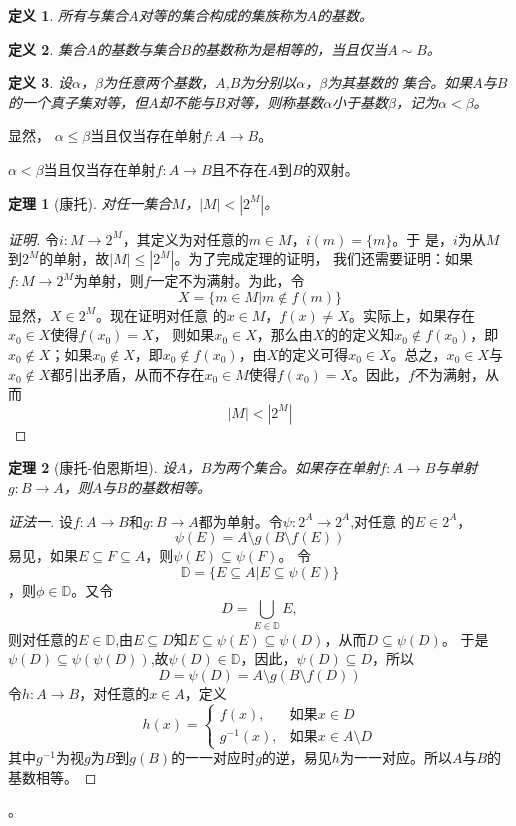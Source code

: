 \documentclass{book}[oneside]
\newtheorem{Def}{定义}[chapter]
\newtheorem{Thm}{定理}[chapter]
\begin{document}
\begin{CJK*}{UTF8}{gbsn}
  \begin{Def}
    所有与集合$A$对等的集合构成的集族称为$A$的基数。
  \end{Def}
    \begin{Def}
    集合$A$的基数与集合$B$的基数称为是相等的，当且仅当$A \sim B$。
  \end{Def}
  \begin{Def}
    设$\alpha$，$\beta$为任意两个基数，$A$,$B$为分别以$\alpha$，$\beta$为其基数的
    集合。如果$A$与$B$的一个真子集对等，但$A$却不能与$B$对等，则称基数$\alpha$小于基数$\beta$，记为$\alpha < \beta$。
  \end{Def}
  显然，
  $\alpha \leq \beta$当且仅当存在单射$f:A \to B$。

  $\alpha < \beta$当且仅当存在单射$f:A \to B$且不存在$A$到$B$的双射。

  \begin{Thm}[康托]
    对任一集合$M$，$|M| < |2^{M}|$。
  \end{Thm}
  \begin{proof}[证明]
    令$i:M\to
    2^M$，其定义为对任意的$m\in M$，$i(m)=\{m\}$。于
    是，$i$为从$M$到$2^M$的单射，故$|M|\leq |2^M|$。为了完成定理的证明，
    我们还需要证明：如果$f:M\to 2^M$为单射，则$f$一定不为满射。为此，令
    \[X=\{m\in M|m \notin f(m)\}\]显然，$X\in 2^M$。现在证明对任意
    的$x\in M$，$f(x)\neq X$。实际上，如果存在$x_0\in X$使得$f(x_0)=X$，
    则如果$x_0\in X$，那么由$X$的的定义知$x_0\notin
    f(x_0)$，即$x_0\notin X$；如果$x_0\notin X$，即$x_0\notin f(x_0)$，由$X$的定义可得$x_0\in X$。总之，$x_0\in X$与$x_0\notin X$都引出矛盾，从而不存在$x_0\in M$使得$f(x_0)=X$。因此，$f$不为满射，从而
    \[|M|<|2^M|\]
  \end{proof}
  \begin{Thm}[康托-伯恩斯坦]
    设$A$，$B$为两个集合。如果存在单射$f:A\to B$与单射$g:B\to A$，则$A$与$B$的基数相等。
  \end{Thm}

  \begin{proof}[证法一]
    设$f:A\to B$和$g:B\to A$都为单射。令$\psi:2^A\to 2^A$,对任意
    的$E\in 2^A$，\[\psi(E)=A\setminus g(B\setminus f(E))\]易见，如果$E\subseteq F\subseteq A$，则$\psi(E)\subseteq \psi(F)$。
    令\[\mathbb{D}=\{E\subseteq A|E\subseteq \psi(E)\}\]，则$\phi\in \mathbb{D}$。又令
    \[D=\bigcup_{E\in \mathbb{D}}E,\]
    则对任意的$E\in \mathbb{D}$,由$E\subseteq D$知$E\subseteq \psi(E) \subseteq \psi(D)$，从而$D\subseteq \psi(D)$。
    于是$\psi(D)\subseteq \psi(\psi(D))$,故$\psi(D)\in \mathbb{D}$，因此，$\psi(D)\subseteq D$，所以
    \[D=\psi(D)=A\setminus g(B\setminus f(D))\]
    令$h:A\to B$，对任意的$x\in A$，定义
    \[h(x)=\begin{cases}
        f(x),&\text{如果}x\in D\\
        g^{-1}(x),&\text{如果}x\in A\setminus D
      \end{cases}
    \]
    其中$g^{-1}$为视$g$为$B$到$g(B)$的一一对应时$g$的逆，易见$h$为一一对应。所以$A$与$B$的基数相等。
  \end{proof}。


\end{CJK*}
\end{document}
